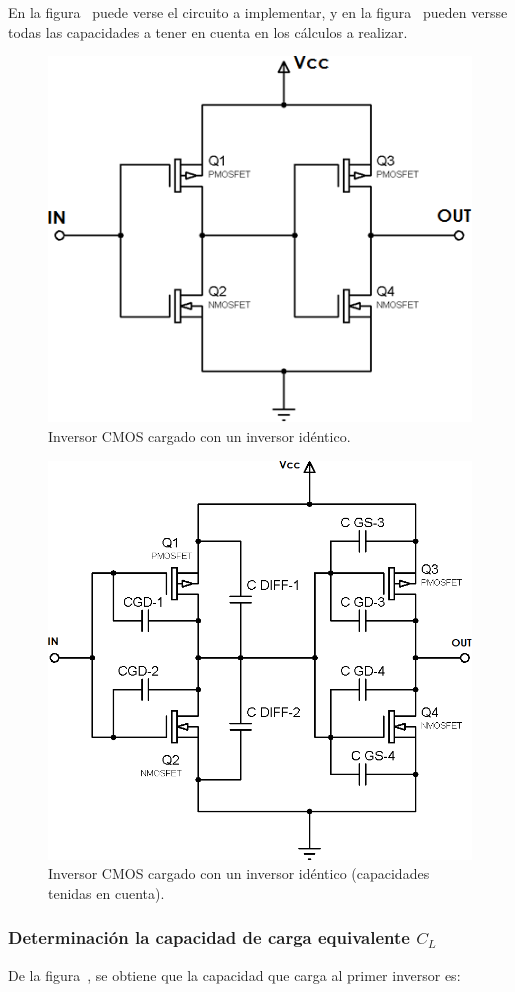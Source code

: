 En la figura~ puede verse el circuito a implementar, y en la figura~ pueden versse todas las capacidades a tener en cuenta en los cálculos a realizar.


\begin{figure}[H] %
\begin{center}
\includegraphics[width=0.3 \textwidth, angle=0]{./img/point1/inverter_loaded_with_inverter}
\caption{\label{fig:fig_inverter_loaded_with_inverter}\footnotesize{Inversor CMOS cargado con un inversor idéntico.}}
\end{center}
\end{figure}



\begin{figure}[H] %
\begin{center}
\includegraphics[width=0.3 \textwidth, angle=0]{./img/point1/inverter_loaded_with_inverter_capacitances}
\caption{\label{fig:fig_inverter_loaded_with_inverter_capacitances}\footnotesize{Inversor CMOS cargado con un inversor idéntico (capacidades tenidas en cuenta).}}
\end{center}
\end{figure}



\vfill

\clearpage


\subsubsection{Determinación la capacidad de carga equivalente $C_{L}$}


De la figura~, se obtiene que la capacidad que carga al primer inversor es:



